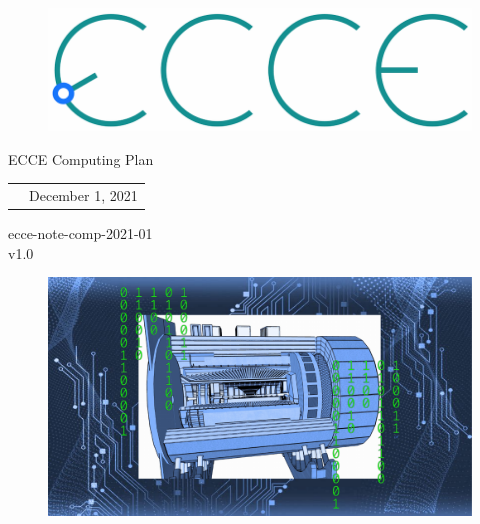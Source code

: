 \renewcommand*\familydefault{\sfdefault}
{\sffamily
\vfill
\vspace{4cm}
\begin{figure}[H]
  \begin{center}
  \includegraphics[width=0.3\linewidth]{figs/ecce-logo.png}
\end{center}
\end{figure}

\begin{center}
  \large
  {\LARGE{ECCE Computing Plan}}

  \begin{tabular}{cc}

&December 1, 2021 \\
  \end{tabular}
  \end{center}

\vspace{15cm}
\hspace*{0pt}\hfill ecce-note-comp-2021-01 \\
\hspace*{0pt}\hfill v1.0
\vspace{-15cm}

\vspace{1cm}

\begin{figure}[H]
  \begin{center}
    \includegraphics[width=0.9\linewidth]{figs/ECCE_Computing_Fig2.pdf}
  \end{center}
\end{figure}
}


\vfill
\renewcommand*\familydefault{\rmdefault}
